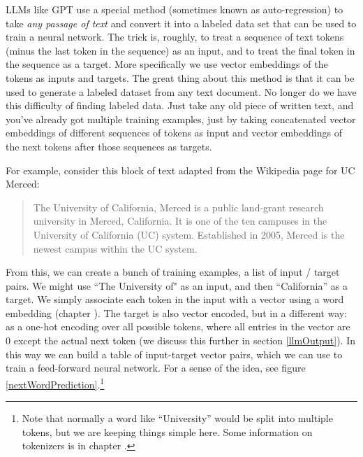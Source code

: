 LLMs like GPT use a special method (sometimes known as auto-regression) to take \emph{any passage of text} and convert it into a labeled data set that can be used to train a neural network. The trick is, roughly, to treat a sequence of text tokens (minus the last token in the sequence) as an input, and to treat the final token in the sequence as a target. More specifically we use vector embeddings of the tokens as inputs and targets. The great thing about this method is that it can be used to generate a labeled dataset from any text document. No longer do we have this difficulty of finding labeled data. Just take any old piece of written text, and you've already got multiple training examples, just by taking concatenated vector embeddings of different sequences of tokens as input and vector embeddings of the next tokens after those sequences as targets.

For example, consider this block of text adapted from the Wikipedia page for UC Merced:

\begin{quote}
The University of California, Merced is a public land-grant research university in Merced, California. It is one of the ten campuses in the University of California (UC) system. Established in 2005, Merced is the newest campus within the UC system.
\end{quote}

From this, we can create a bunch of training examples, a list of input / target pairs. We might use ``The University of" as an input, and then ``California'' as a target. We simply associate each token in the input with a vector using a word embedding (chapter ). The target is also vector encoded, but in a different way: as a one-hot encoding over all possible tokens, where all entries in the vector are 0 except the actual next token (we discuss this further in section \ref{llmOutput}). In this way we can build a table of input-target vector pairs, which we can use to train a feed-forward neural network. For a sense of the idea, see figure \ref{nextWordPrediction}.\footnote{Note that normally a word like ``University'' would be split into multiple tokens, but we are keeping things simple here. Some information on tokenizers is in chapter .} 

